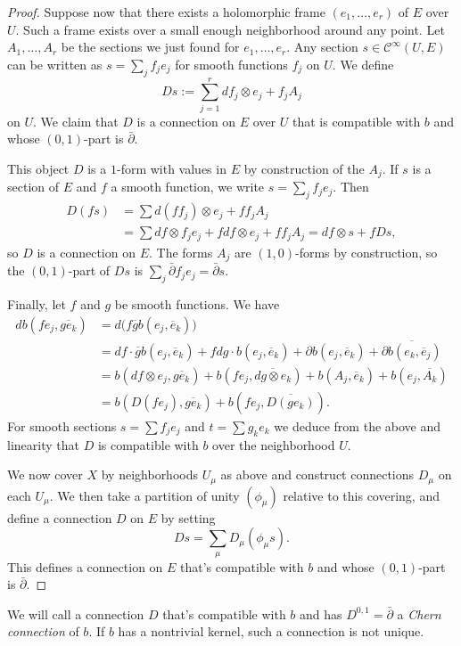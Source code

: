 \documentclass[10pt,a4paper]{amsart}
\theoremstyle{definition}
\newcommand{\cc}[1]{\mathcal{#1}}
\def\ov#1{\overline{#1}}
\begin{document}
\begin{proof}
Suppose now that there exists a holomorphic frame $(e_1, \ldots, e_r)$ of $E$ over $U$. Such a frame exists over a small enough neighborhood around any point. Let $A_1, \ldots, A_r$ be the sections we just found for $e_1, \ldots, e_r$. Any section $s \in \cc C^\infty(U, E)$ can be written as $s = \sum_j f_j e_j$ for smooth functions $f_j$ on $U$. We define
\[
D s := \sum_{j=1}^r df_j \otimes e_j + f_j A_j
\]
on $U$. We claim that $D$ is a connection on $E$ over $U$ that is compatible with $b$ and whose $(0,1)$-part is $\bar\partial$.

This object $D$ is a $1$-form with values in $E$ by construction of the $A_j$. If $s$ is a section of $E$ and $f$ a smooth function, we write $s = \sum_j f_j e_j$. Then
\begin{align*}
D(fs)
&= \sum d(f f_j) \otimes e_j + f f_j A_j
\\
&= \sum df \otimes f_j e_j + f df \otimes e_j + f f_j A_j
= df \otimes s + f Ds,
\end{align*}
so $D$ is a connection on $E$. The forms $A_j$ are $(1,0)$-forms by construction, so the $(0,1)$-part of $Ds$ is $\sum_j \bar\partial f_j e_j = \bar\partial s$.

Finally, let $f$ and $g$ be smooth functions. We have
\begin{align*}
d b(fe_j, \ov{ge_k})
&= d\bigl(f \ov g b(e_j, \ov e_k) \bigr)
\\
&= df \cdot \ov g b(e_j, \ov e_k)
+ f dg \cdot b(e_j, \ov e_k)
+ \partial b(e_j, \ov e_k)
+ \ov{\partial b(e_k, \ov e_j)}
\\
&= b(df \otimes e_j, \ov{ge_k})
+ b(f e_j, \ov{dg \otimes e_k})
+ b(A_j, \ov e_k)
+ b(e_j, \ov{A_k})
\\
&= b(D(f e_j), \ov{ge_k}) + b(f e_j, \ov{D(g e_k)}).
\end{align*}
For smooth sections $s = \sum f_j e_j$ and $t = \sum g_k e_k$ we deduce from the above and linearity that $D$ is compatible with $b$ over the neighborhood $U$.

We now cover $X$ by neighborhoods $U_\mu$ as above and construct connections $D_\mu$ on each $U_\mu$. We then take a partition of unity $(\phi_\mu)$ relative to this covering, and define a connection $D$ on $E$ by setting
\[
D s = \sum_\mu D_\mu(\phi_\mu s).
\]
This defines a connection on $E$ that's compatible with $b$ and whose $(0,1)$-part is $\bar\partial$.
\end{proof}



We will call a connection $D$ that's compatible with $b$ and has $D^{0,1} = \bar\partial$ a \emph{Chern connection} of $b$. If $b$ has a nontrivial kernel, such a connection is not unique.
\end{document}
